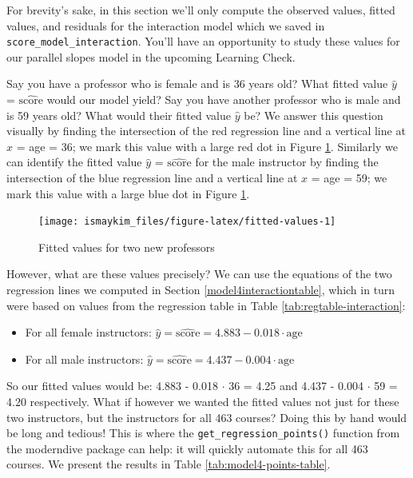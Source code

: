 \documentclass[12pt, krantz2,]{krantz}
\providecommand{\tightlist}{%
  \setlength{\itemsep}{0pt}\setlength{\parskip}{0pt}}
\begin{document}
For brevity's sake, in this section we'll only compute the observed values, fitted values, and residuals for the interaction model which we saved in \texttt{score\_model\_interaction}. You'll have an opportunity to study these values for our parallel slopes model in the upcoming Learning Check.

Say you have a professor who is female and is 36 years old? What fitted value \(\widehat{y}\) = \(\widehat{\text{score}}\) would our model yield? Say you have another professor who is male and is 59 years old? What would their fitted value \(\widehat{y}\) be? We answer this question visually by finding the intersection of the red regression line and a vertical line at \(x\) = age = 36; we mark this value with a large red dot in Figure \ref{fig:fitted-values}. Similarly we can identify the fitted value \(\widehat{y}\) = \(\widehat{\text{score}}\) for the male instructor by finding the intersection of the blue regression line and a vertical line at \(x\) = age = 59; we mark this value with a large blue dot in Figure \ref{fig:fitted-values}.

\begin{figure}

{\centering \texttt{[image: ismaykim\_files/figure-latex/fitted-values-1]} 

}

\caption{Fitted values for two new professors}\label{fig:fitted-values}
\end{figure}

However, what are these values precisely? We can use the equations of the two regression lines we computed in Section \ref{model4interactiontable}, which in turn were based on values from the regression table in Table \ref{tab:regtable-interaction}:

\begin{itemize}
\tightlist
\item
  For all female instructors: \(\widehat{y} = \widehat{\text{score}} = 4.883 - 0.018 \cdot \mbox{age}\)
\item
  For all male instructors: \(\widehat{y} = \widehat{\text{score}} = 4.437 - 0.004 \cdot \mbox{age}\)
\end{itemize}

So our fitted values would be: 4.883 - 0.018 \(\cdot\) 36 = 4.25 and 4.437 - 0.004 \(\cdot\) 59 = 4.20 respectively. What if however we wanted the fitted values not just for these two instructors, but the instructors for all 463 courses? Doing this by hand would be long and tedious! This is where the \texttt{get\_regression\_points()} function from the moderndive package can help: it will quickly automate this for all 463 courses. We present the results in Table \ref{tab:model4-points-table}.
\end{document}
